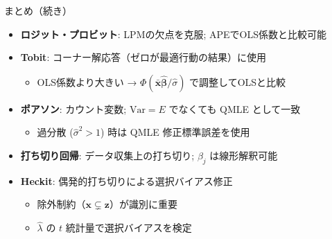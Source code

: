 \documentclass[
  ignorenonframetext,
]{beamer}
\providecommand{\tightlist}{%
  \setlength{\itemsep}{0pt}\setlength{\parskip}{0pt}}
\begin{document}
\begin{frame}{まとめ（続き）}
\protect\hypertarget{ux307eux3068ux3081ux7d9aux304d}{}
\begin{itemize}
\tightlist
\item
  \textbf{ロジット・プロビット}: LPMの欠点を克服; APEでOLS係数と比較可能
\item
  \textbf{Tobit}: コーナー解応答（ゼロが最適行動の結果）に使用

  \begin{itemize}
  \tightlist
  \item
    OLS係数より大きい →
    \(\Phi(\bar{\mathbf{x}}\hat{\boldsymbol{\beta}}/\hat{\sigma})\)
    で調整してOLSと比較
  \end{itemize}
\item
  \textbf{ポアソン}: カウント変数; \(\text{Var}=E\) でなくても QMLE
  として一致

  \begin{itemize}
  \tightlist
  \item
    過分散 (\(\hat{\sigma}^2 > 1\)) 時は QMLE 修正標準誤差を使用
  \end{itemize}
\item
  \textbf{打ち切り回帰}: データ収集上の打ち切り; \(\beta_j\)
  は線形解釈可能
\item
  \textbf{Heckit}: 偶発的打ち切りによる選択バイアス修正

  \begin{itemize}
  \tightlist
  \item
    除外制約（\(\mathbf{x} \subsetneq \mathbf{z}\)）が識別に重要
  \item
    \(\hat{\lambda}\) の \(t\) 統計量で選択バイアスを検定
  \end{itemize}
\end{itemize}
\end{frame}
\end{document}
